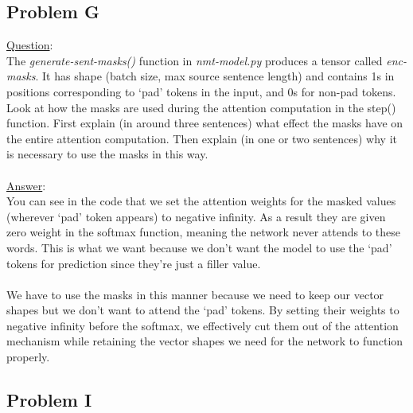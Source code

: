 \documentclass[12pt]{article}
\begin{document}
\subsection{Problem G}
\underline{Question}:
~\\
The \emph{generate-sent-masks()} function in \emph{nmt-model.py} produces a tensor 
called \emph{enc-masks}. It has shape (batch size, max source sentence length) 
and contains 1s in positions corresponding to ‘pad’ tokens in the input, 
and 0s for non-pad tokens. Look at how the masks are used during the 
attention computation in the step() function.
First explain (in around three sentences) what effect the masks have 
on the entire attention computation. Then explain (in one or two 
sentences) why it is necessary to use the masks in this way.
~\\
~\\
\underline{Answer}: 
~\\
You can see in the code that we set the attention weights for the masked 
values (wherever ‘pad’ token appears) to negative infinity. As a result 
they are given zero weight in the softmax function, meaning the network 
never attends to these words. This is what we want because we don't want 
the model to use the ‘pad’ tokens for prediction since they're just a filler 
value. 
~\\
~\\
We have to use the masks in this manner because we need to keep our 
vector shapes but we don't want to attend the ‘pad’ tokens. By setting 
their weights to negative infinity before the softmax, we effectively 
cut them out of the attention mechanism while retaining the vector shapes 
we need for the network to function properly. 

\subsection{Problem I}
\end{document}
